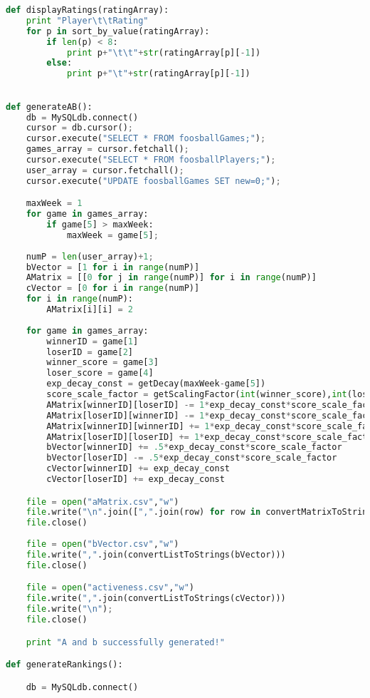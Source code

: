 \documentclass[12pt, letterpaper]{article}
\begin{document}
\begin{lstlisting}[language=python]
def displayRatings(ratingArray):
    print "Player\t\tRating"
    for p in sort_by_value(ratingArray):
        if len(p) < 8:
            print p+"\t\t"+str(ratingArray[p][-1])
        else:
            print p+"\t"+str(ratingArray[p][-1])
                

def generateAB():
    db = MySQLdb.connect()
    cursor = db.cursor();
    cursor.execute("SELECT * FROM foosballGames;");
    games_array = cursor.fetchall();
    cursor.execute("SELECT * FROM foosballPlayers;");
    user_array = cursor.fetchall();
    cursor.execute("UPDATE foosballGames SET new=0;");

    maxWeek = 1
    for game in games_array:
        if game[5] > maxWeek:
            maxWeek = game[5];
        
    numP = len(user_array)+1;
    bVector = [1 for i in range(numP)]
    AMatrix = [[0 for j in range(numP)] for i in range(numP)]
    cVector = [0 for i in range(numP)]
    for i in range(numP):
        AMatrix[i][i] = 2
        
    for game in games_array:
        winnerID = game[1]
        loserID = game[2]
        winner_score = game[3]
        loser_score = game[4]
        exp_decay_const = getDecay(maxWeek-game[5])
        score_scale_factor = getScalingFactor(int(winner_score),int(loser_score))
        AMatrix[winnerID][loserID] -= 1*exp_decay_const*score_scale_factor
        AMatrix[loserID][winnerID] -= 1*exp_decay_const*score_scale_factor
        AMatrix[winnerID][winnerID] += 1*exp_decay_const*score_scale_factor
        AMatrix[loserID][loserID] += 1*exp_decay_const*score_scale_factor
        bVector[winnerID] += .5*exp_decay_const*score_scale_factor
        bVector[loserID] -= .5*exp_decay_const*score_scale_factor
        cVector[winnerID] += exp_decay_const
        cVector[loserID] += exp_decay_const

    file = open("aMatrix.csv","w")
    file.write("\n".join([",".join(row) for row in convertMatrixToStrings(AMatrix)]))
    file.close()
        
    file = open("bVector.csv","w")
    file.write(",".join(convertListToStrings(bVector)))
    file.close()

    file = open("activeness.csv","w")
    file.write(",".join(convertListToStrings(cVector)))
    file.write("\n");
    file.close()

    print "A and b successfully generated!"

def generateRankings():

    db = MySQLdb.connect()


\end{lstlisting}
\end{document}
